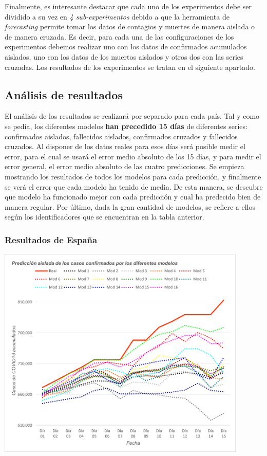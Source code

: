 \documentclass[12pt,a4paper, xcolor=table]{article}
\begin{document}
        Finalmente, es interesante destacar que cada uno de los experimentos debe ser dividido a su vez en \textit{4 sub-experimentos} debido a que la herramienta de \textit{forecasting} permite tomar los datos de contagios y muertes de manera aislada o de manera cruzada. Es decir, para cada una de las configuraciones de los experimentos debemos realizar uno con los datos de confirmados acumulados aislados, uno con los datos de los muertos aislados y otros dos con las series cruzadas. Los resultados de los experimentos se tratan en el siguiente apartado.

        \subsection{Análisis de resultados}
            El análisis de los resultados se realizará por separado para cada país. Tal y como se pedía, los diferentes modelos \textbf{han precedido 15 días} de diferentes series: confirmados aislados, fallecidos aislados, confirmados cruzados y fallecidos cruzados. Al disponer de los datos reales para esos días será posible medir el error, para el cual se usará el error medio absoluto de los 15 días, y para medir el error general, el error medio absoluto de las cuatro predicciones. Se empieza mostrando los resultados de todos los modelos para cada predicción, y finalmente se verá el error que cada modelo ha tenido de media. De esta manera, se descubre que modelo ha funcionado mejor con cada predicción y cual ha predecido bien de manera regular. Por último, dada la gran cantidad de modelos, se refiere a ellos según los identificadores que se encuentran en la tabla anterior.

            \subsubsection{Resultados de España}

            \begin{center}
                \centering
                \includegraphics[width=450px]{img/pred_a_conf_ES.png}
            \end{center}
\end{document}
